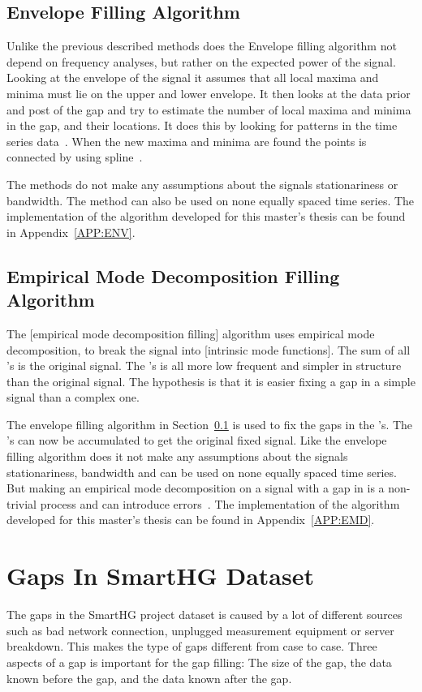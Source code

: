 \subsection{Envelope Filling Algorithm}
\label{T:EGA}
Unlike the previous described methods does the Envelope filling algorithm not depend on frequency analyses, but rather on the expected power of the signal. Looking at the envelope of the signal it assumes that all local maxima and minima must lie on the  upper and lower envelope. It then looks at the data prior and post of the gap and try to estimate the number of local maxima and minima in the gap, and their locations. It does this by looking for patterns in the time series data~\citep{RefWorks:6}. When the new maxima and minima are found the points is connected by using spline~\cite{RefWorks:16}. 

The methods do not make any assumptions about the signals stationariness or bandwidth. The method can also be used on none equally spaced time series. The implementation of the algorithm developed for this master's thesis can be found in Appendix~\ref{APP:ENV}.

\subsection{Empirical Mode Decomposition Filling Algorithm}
The [empirical mode decomposition filling] algorithm uses empirical mode decomposition, to break the signal into [intrinsic mode functions]. The sum of all 's is the original signal. The 's is all more low frequent and simpler in structure than the original signal. The hypothesis is that it is easier fixing a gap in a simple signal than a complex one. 

The envelope filling algorithm in Section~\ref{T:EGA} is used to fix the gaps in the 's. The 's can now be accumulated to get the original fixed signal. Like the envelope filling algorithm does it not make any assumptions about the signals stationariness, bandwidth and can be used on none equally spaced time series. But making an empirical mode decomposition on a signal with a gap in is a non-trivial process and can introduce errors~\citep{RefWorks:16}. The implementation of the algorithm developed for this master's thesis can be found in Appendix~\ref{APP:EMD}.

\section{Gaps In SmartHG Dataset}
The gaps in the SmartHG project dataset is caused by a lot of different sources such as bad network connection, unplugged measurement equipment or server breakdown. This makes the type of gaps different from case to case. Three aspects of a gap is important for the gap filling: The size of the gap, the data known before the gap, and the data known after the gap. 

